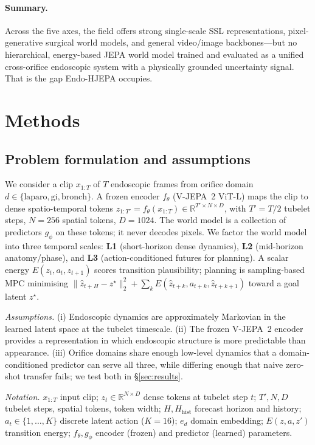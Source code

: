 \documentclass[final,3p,times,twocolumn]{elsarticle}
\begin{document}
\paragraph{Summary.} Across the five axes, the field offers strong single-scale SSL representations, pixel-generative surgical world models, and general video/image backbones---but no hierarchical, energy-based JEPA world model trained and evaluated as a unified cross-orifice endoscopic system with a physically grounded uncertainty signal. That is the gap Endo-HJEPA occupies.

\section{Methods}

\subsection{Problem formulation and assumptions}
We consider a clip $x_{1:T}$ of $T$ endoscopic frames from orifice domain $d \in \{\mathrm{laparo},\mathrm{gi},\mathrm{bronch}\}$. A frozen encoder $f_\theta$ (V-JEPA~2 ViT-L) maps the clip to dense spatio-temporal tokens $z_{1:T'} = f_\theta(x_{1:T}) \in \mathbb{R}^{T' \times N \times D}$, with $T'{=}T/2$ tubelet steps, $N{=}256$ spatial tokens, $D{=}1024$. The world model is a collection of predictors $g_\phi$ on these tokens; it never decodes pixels. We factor the world model into three temporal scales: \textbf{L1} (short-horizon dense dynamics), \textbf{L2} (mid-horizon anatomy/phase), and \textbf{L3} (action-conditioned futures for planning). A scalar energy $E(z_t,a_t,z_{t+1})$ scores transition plausibility; planning is sampling-based MPC minimising $\|\hat z_{t+H}-z^\star\|_2^2 + \sum_k E(\hat z_{t+k},a_{t+k},\hat z_{t+k+1})$ toward a goal latent $z^\star$.

\emph{Assumptions.} (i) Endoscopic dynamics are approximately Markovian in the learned latent space at the tubelet timescale. (ii) The frozen V-JEPA~2 encoder provides a representation in which endoscopic structure is more predictable than appearance. (iii) Orifice domains share enough low-level dynamics that a domain-conditioned predictor can serve all three, while differing enough that naive zero-shot transfer fails; we test both in \S\ref{sec:results}.

\emph{Notation.} $x_{1:T}$ input clip; $z_t \in \mathbb{R}^{N\times D}$ dense tokens at tubelet step $t$; $T',N,D$ tubelet steps, spatial tokens, token width; $H,H_{\mathrm{hist}}$ forecast horizon and history; $a_t\in\{1,\dots,K\}$ discrete latent action ($K{=}16$); $e_d$ domain embedding; $E(z,a,z')$ transition energy; $f_\theta,g_\phi$ encoder (frozen) and predictor (learned) parameters.
\end{document}
